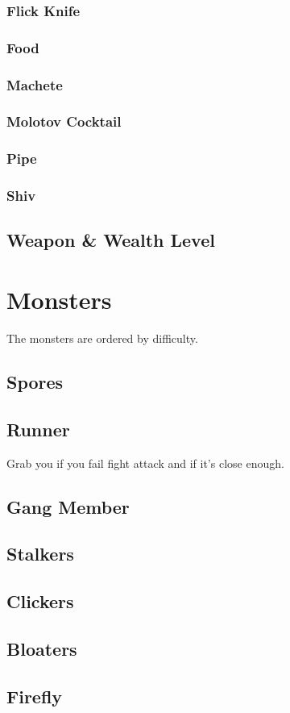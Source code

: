 \documentclass[10pt,twoside,twocolumn]{book}
\begin{document}
\subsection{Flick Knife}

\subsection{Food}

\subsection{Machete}

\subsection{Molotov Cocktail}

\subsection{Pipe}

\subsection{Shiv}

\section{Weapon \& Wealth Level}

%
%
\mainmatter
\chapter{Monsters}

The monsters are ordered by difficulty.

\section{Spores}

\section{Runner}

Grab you if you fail fight attack and if it's close enough.

\section{Gang Member}

\section{Stalkers}

\section{Clickers}

\section{Bloaters}

\section{Firefly}
\end{document}

